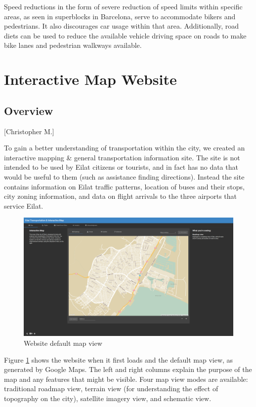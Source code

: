 \documentclass[12pt]{article}                               %
\begin{document}
Speed reductions in the form of severe reduction of speed limits within specific areas, as seen in superblocks in Barcelona, serve to accommodate bikers and pedestrians. It also discourages car usage within that area. Additionally, road diets can be used to reduce the available vehicle driving space on roads to make bike lanes and pedestrian walkways available.


\newpage
\section{Interactive Map Website}\label{sec:site}
\subsection{Overview}[Christopher M.]

To gain a better understanding of transportation within the city, we created an interactive mapping \& general transportation information site. The site is not intended to be used by Eilat citizens or tourists, and in fact has no data that would be useful to them (such as assistance finding directions). Instead the site contains information on Eilat traffic patterns, location of buses and their stops, city zoning information, and data on flight arrivals to the three airports that service Eilat. 

\begin{figure}[H]
    \centering
    \includegraphics[width=1\columnwidth]{images/site_map.png}
    \caption{Website default map view}
    \label{img:site_map}
\end{figure}

Figure \ref{img:site_map} shows the website when it first loads and the default map view, as generated by Google Maps. The left and right columns explain the purpose of the map and any features that might be visible. Four map view modes are available: traditional roadmap view, terrain view (for understanding the effect of topography on the city), satellite imagery view, and schematic view.
\end{document}
